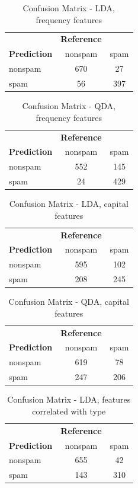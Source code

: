 \documentclass{article}\usepackage[]{graphicx}\usepackage[]{xcolor}
\begin{document}
\begin{table}[h]
	\centering
	\begin{tabular}{lcc}
		& \textbf{Reference} & \\
		\textbf{Prediction} & nonspam & spam \\
		nonspam & 670 & 27 \\
		spam & 56 & 397 \\
	\end{tabular}
	\caption{Confusion Matrix - LDA, frequency features}
	\label{tab:confusion_matrix_lda2}
\end{table}

\begin{table}[h]
	\centering
	\begin{tabular}{lcc}
		& \textbf{Reference} & \\
		\textbf{Prediction} & nonspam & spam \\
		nonspam & 552 & 145 \\
		spam & 24 & 429 \\
	\end{tabular}
	\caption{Confusion Matrix - QDA, frequency features}
	\label{tab:confusion_matrix_qda2}
\end{table}

\begin{table}[h]
	\centering
	\begin{tabular}{lcc}
		& \textbf{Reference} & \\
		\textbf{Prediction} & nonspam & spam \\
		nonspam & 595 & 102 \\
		spam & 208 & 245 \\
	\end{tabular}
	\caption{Confusion Matrix - LDA, capital features}
	\label{tab:confusion_matrix_lda3}
\end{table}

\begin{table}[h]
	\centering
	\begin{tabular}{lcc}
		& \textbf{Reference} & \\
		\textbf{Prediction} & nonspam & spam \\
		nonspam & 619 & 78 \\
		spam & 247 & 206 \\
	\end{tabular}
	\caption{Confusion Matrix - QDA, capital features}
	\label{tab:confusion_matrix_qda3}
\end{table}

\begin{table}[h]
	\centering
	\begin{tabular}{lcc}
		& \textbf{Reference} & \\
		\textbf{Prediction} & nonspam & spam \\
		nonspam & 655 & 42 \\
		spam & 143 & 310 \\
	\end{tabular}
	\caption{Confusion Matrix - LDA, features correlated with type}
	\label{tab:confusion_matrix_lda4}
\end{table}
\end{document}
